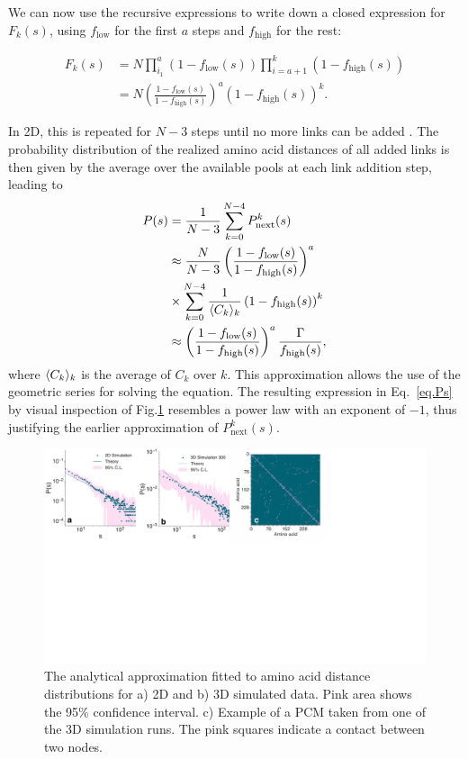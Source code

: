 \documentclass[
reprint,
twocolumn,
amsmath,amssymb,superscriptaddress,aps,
pre]{revtex4-1}
\DeclarePairedDelimiter{\evdel}{\langle}{\rangle}
\newcommand{\Pin}{P_{\mathrm{next}}}
\newcommand{\fhigh}{f_{\mathrm{high}}}
\newcommand{\flow}{f_{\mathrm{low}}}
\begin{document}
We can now use the recursive expressions to write down a closed expression for $F_k(s)$, using $\flow$ for the first $a$ steps and $\fhigh$ for the rest:

\begin{align}
    F_k(s)&=N\prod_{i_1}^a\left(1-\flow(s)\right)\prod_{i=a+1}^k\left(1-\fhigh(s)\right) \nonumber \\
    &= N\left(\frac{1-\flow(s)}{1-\fhigh(s)}\right)^a\left(1-\fhigh(s)\right)^{k}.
\end{align}

In 2D, this is repeated for $N-3$ steps until no more links can be added \cite{molkenthin2016scaling}.
The probability distribution of the realized amino acid distances of all added links is then given by the average over the available pools at each link addition step, leading to
\begin{align}
    P(s)&=\frac{1}{N-3}\sum_{k=0}^{N-4} \Pin^k(s) \nonumber \\
    &\approx \frac{N}{N-3}\left(\frac{1-\flow(s)}{1-\fhigh(s)}\right)^a \nonumber\\
&\times \sum_{k=0}^{N-4} \frac{1}{\evdel{C_k}_k} \left(1-\fhigh(s)\right)^{k} \nonumber \\
    &\approx \left(\frac{1-\flow(s)}{1-\fhigh(s)}\right)^a\frac{\Gamma}{\fhigh(s)},
    \label{eq.Ps}
\end{align}
where $\evdel{C_k}_k$ is the average of $C_k$ over $k$.
This approximation allows the use of the geometric series for solving the equation. 
The resulting expression in Eq.~\ref{eq.Ps} by visual inspection of Fig.\ref{fig:2d_sim} resembles a power law with an exponent of $-1$, thus justifying the earlier approximation of $\Pin^k(s)$.

 \begin{figure}[htb]
        \centering
	\includegraphics[width=\textwidth]{paper/figures/Fig3/Fig3.pdf}
	    \caption{The analytical approximation fitted to amino acid distance distributions for a) 2D and b) 3D simulated data. Pink area shows the 95\% confidence interval. c) Example of a PCM taken from one of the 3D simulation runs. The pink squares indicate a contact between two nodes.}
        \label{fig:2d_sim}
\end{figure}
\end{document}
